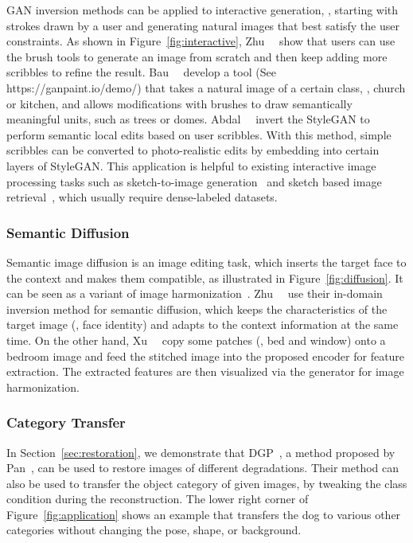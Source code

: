 GAN inversion methods can be applied to interactive generation, \ie, starting with strokes drawn by a user and generating natural images that best satisfy the user constraints. 
As shown in Figure~\ref{fig:interactive}, Zhu~\etal~\cite{zhu2016generative} show that users can use the brush tools to generate an image from scratch and then keep adding more scribbles to refine the result.
Bau~\etal~\cite{bau2019ganpaint} develop a tool (See https://ganpaint.io/demo/) that takes a natural image of a certain class, \eg, church or kitchen, and allows modifications with brushes to draw semantically meaningful units, such as trees or domes.
Abdal~\etal~\cite{abdal2020image2stylegan2} invert the StyleGAN to perform semantic local edits based on user scribbles. 
With this method, simple scribbles can be converted to photo-realistic edits 
by embedding into certain layers of StyleGAN.
This application is helpful to existing interactive image processing tasks such as sketch-to-image generation~\cite{xia2019sketch,ghosh2019isketchnfill,chenDeepFaceDrawing2020} and sketch based image retrieval~\cite{eitz2010sketch,dey2019doodle}, which usually require dense-labeled datasets.

\figinteractive

\subsubsection{Semantic Diffusion}
\label{sec:diffusion}
Semantic image diffusion is an image editing task, which inserts the target face to the context and makes them compatible, as illustrated in Figure~\ref{fig:diffusion}. 
It can be seen as a variant of image harmonization~\cite{cohen2006color,huang2018multimodal,tsai2017deep}.
Zhu~\etal~\cite{zhu2020indomain} use their in-domain inversion method for semantic diffusion, which keeps the characteristics of the target image (\eg, face identity) and adapts to the context information at the same time.
On the other hand, Xu~\etal~\cite{xu2020ghfeat} copy some patches (\eg, bed and window) onto a bedroom image and feed the stitched image into the proposed encoder for feature extraction. 
The extracted features are then visualized via the generator for image harmonization.

\subsubsection{Category Transfer}
\label{sec:category}
In Section~\ref{sec:restoration}, we demonstrate that DGP~\cite{pan2020exploiting}, a method proposed by Pan~\etal, can be used to restore images of different degradations.
Their method can also be used to transfer the object category of given images, by tweaking the class condition during the reconstruction. 
The lower right corner of  Figure~\ref{fig:application} shows an example that transfers the dog to various other categories without changing the pose, shape, or background.

